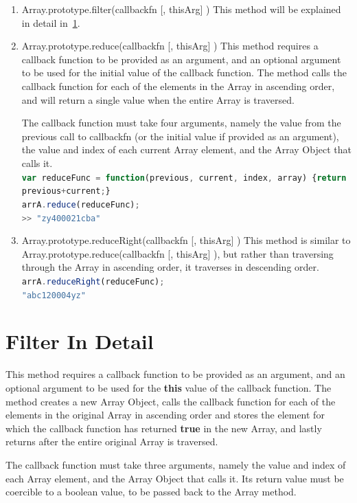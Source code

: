 \documentclass[a4paper,11pt,twoside]{report}
\def\jsinline{\lstinline[language=JavaScript, basicstyle=\small]}
\begin{document}
\begin{enumerate}
\item Array.prototype.filter(callbackfn [, thisArg] ) \newline
This method will be explained in detail in~\ref{sec:filter}.

\item Array.prototype.reduce(callbackfn [, thisArg] ) \newline
This method requires a callback function to be provided as an argument, and an optional argument to be used for the initial value of the callback function. The method calls the callback function for each of the elements in the Array in ascending order, and will return a single value when the entire Array is traversed.

The callback function must take four arguments, namely the value from the previous call to callbackfn (or the initial value if provided as an argument), the value and index of each current Array element, and the Array Object that calls it. \\
\jsinline|var reduceFunc = function(previous, current, index, array) {return previous+current;}|\\
\jsinline|arrA.reduce(reduceFunc);|\\
\jsinline|>> "zy400021cba"|

\item Array.prototype.reduceRight(callbackfn [, thisArg] ) \newline
This method is similar to Array.prototype.reduce(callbackfn [, thisArg] ), but rather than traversing through the Array in ascending order, it traverses in descending order.\\
\jsinline|arrA.reduceRight(reduceFunc);|\\
\jsinline|"abc120004yz"|
\end{enumerate}

\section{Filter In Detail}\label{sec:filter}
This method requires a callback function to be provided as an argument, and an optional argument to be used for the \textbf{this} value of the callback function. The method creates a new Array Object, calls the callback function for each of the elements in the original Array in ascending order and stores the element for which the callback function has returned \textbf{true} in the new Array, and lastly returns after the entire original Array is traversed. 

The callback function must take three arguments, namely the value and index of each Array element, and the Array Object that calls it. Its return value must be coercible to a boolean value, to be passed back to the Array method.
\end{document}
